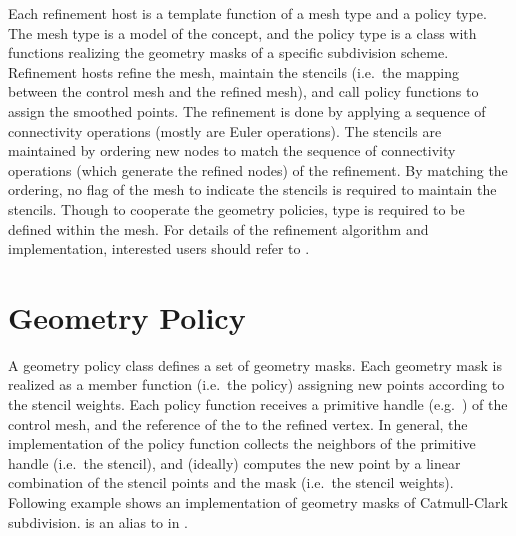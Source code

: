 Each refinement host is a template function of
a mesh type and a policy type. The mesh type is
a model of the  concept, and the
policy type is a class with functions realizing the 
geometry masks of a specific subdivision scheme.
Refinement hosts refine the mesh, maintain the stencils 
(i.e.~the mapping between the control mesh and the refined mesh), 
and call policy functions to assign the smoothed points. 
The refinement is done by applying a sequence of connectivity 
operations (mostly are Euler operations).
The stencils are maintained by ordering new nodes to match the 
sequence of connectivity operations (which generate the refined nodes) 
of the refinement. By matching the ordering, no flag of the mesh
to indicate the stencils is required to maintain the stencils. 
Though to cooperate the geometry policies,  type is 
required to be defined within the mesh. For details of the 
refinement algorithm and implementation, interested users should 
refer to \cite{cgal:sp-mrbee-05} .

\section{Geometry Policy}
A geometry policy class defines a set of geometry masks. 
Each geometry mask is realized as a member function (i.e.~the policy) 
assigning new points according to the stencil weights.
Each policy function receives a primitive handle 
(e.g.~) of the control mesh, and the reference of 
the  to the refined vertex. In general, the implementation of 
the policy function collects the neighbors of the primitive 
handle (i.e.~the stencil), and (ideally) computes the new point 
by a linear combination of the stencil 
points and the mask (i.e.~the stencil weights).
Following example shows an implementation of geometry masks 
of Catmull-Clark subdivision.  is an alias to 
in .

